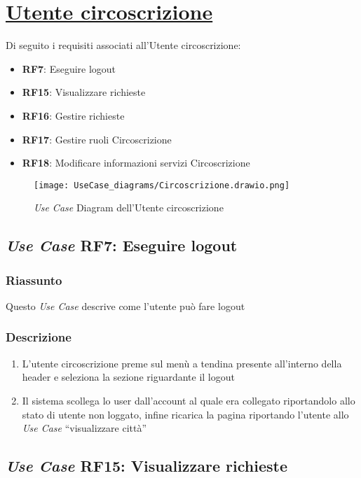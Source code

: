 \section{\texorpdfstring{\underline{Utente circoscrizione}}{Utente circoscrizione}}
    Di seguito i requisiti associati all'Utente circoscrizione:
    \begin{itemize}
        \item \textbf{RF7}: Eseguire logout
        \item \textbf{RF15}: Visualizzare richieste
        \item \textbf{RF16}: Gestire richieste
        \item \textbf{RF17}: Gestire ruoli Circoscrizione
        \item \textbf{RF18}: Modificare informazioni servizi Circoscrizione
    \end{itemize}
    \begin{figure}[H]
        \centering
        \texttt{[image: UseCase\_diagrams/Circoscrizione.drawio.png]}
        \caption{\textit{Use Case} Diagram dell'Utente circoscrizione}
    \end{figure}

    \subsection{\textit{Use Case} RF7: Eseguire logout}
        \subsubsection{Riassunto}
            Questo \textit{Use Case} descrive come l'utente può fare logout
        \subsubsection{Descrizione}
            \begin{enumerate}
                \item L'utente circoscrizione preme sul menù a tendina presente all'interno della header e seleziona la sezione riguardante il logout
                \item Il sistema scollega lo user dall'account al quale era collegato riportandolo allo stato di utente non loggato, infine 
                ricarica la pagina riportando l'utente allo \textit{Use Case} ``visualizzare città''
            \end{enumerate}

    \subsection{\textit{Use Case} RF15: Visualizzare richieste}
